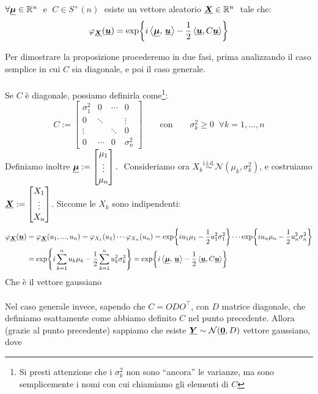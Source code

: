 \begin{proposizione}
    $\forall\underline{{\boldsymbol{\mu}}}\in\mathbb{R}^n\;$ e $\;C\in S^+(n) \;$ esiste un vettore aleatorio $\underline{{\boldsymbol{X}}}\in\mathbb{R}^n\;$ tale che:
    \[\varphi_{\underline{{\boldsymbol{X}}}} (\underline{{\boldsymbol{u}}}) = \exp\!\left\{i\left\langle \underline{{\boldsymbol{\mu}}},\, \underline{{\boldsymbol{u}}} \right\rangle-\frac{1}{2}\left\langle\underline{{\boldsymbol{u}}}, C\underline{{\boldsymbol{u}}}\right\rangle \right\}\]
    \begin{dimostrazione}
        Per dimostrare la proposizione procederemo in due fasi, prima analizzando il caso semplice in cui $C$ sia diagonale, e poi il caso generale.\\
        \\
        Se $C$ è diagonale, possiamo definirla come\footnote{Si presti attenzione che i $\sigma_k^2$ non sono ``ancora'' le varianze, ma sono semplicemente i nomi con cui chiamiamo gli elementi di $C$}:
        \[
        C := 
        \begin{bmatrix}
        \sigma_1^2 & 0 & \cdots & 0\\
        0 & \ddots & & \vdots\\
        \vdots & & \ddots & 0\\
        0 & \cdots & 0 & \sigma_n^2
        \end{bmatrix}\qquad \text{con}\qquad \sigma_k^2\geq0\;\;\forall k = 1, ..., n
        \]
        Definiamo inoltre $\underline{{\boldsymbol{\mu}}} := \begin{bmatrix}\mu_1\\\vdots\\\mu_n\end{bmatrix}.\;$ Consideriamo ora $X_k\overset{\text{i.i.d.}}{\sim}\mathcal{N}(\mu_k, \sigma_k^2)$, e costruiamo $\underline{{\boldsymbol{X}}}:=\begin{bmatrix}X_1\\\vdots\\X_n\end{bmatrix}$. Siccome le $X_k$ sono indipendenti:
        \begin{align*}
            \varphi_{\underline{{\boldsymbol{X}}}}(\underline{{\boldsymbol{u}}}) & = \varphi_{\underline{{\boldsymbol{X}}}}(u_1, ..., u_n) = \varphi_{X_1}(u_1)\cdots \varphi_{X_n}(u_n) = \exp\!\left\{iu_1\mu_1 - \frac{1}{2} u_1^2\sigma_1^2 \right\} \cdots \exp\!\left\{iu_n\mu_n - \frac{1}{2} u_n^2\sigma_n^2 \right\} \\
            & = \exp\!\left\{i \sum_{k=1}^n u_k \mu_k - \frac{1}{2}\sum_{k=1}^n u_k^2 \sigma_k^2 \right\} = \exp\!\left\{i\left\langle \underline{{\boldsymbol{\mu}}},\, \underline{{\boldsymbol{u}}} \right\rangle-\frac{1}{2}\left\langle\underline{{\boldsymbol{u}}}, C\underline{{\boldsymbol{u}}}\right\rangle \right\}
        \end{align*}
        \noindent Che è il vettore gaussiano\\
        \\
        Nel caso generale invece, sapendo che $C=ODO^\top$, con $D$ matrice diagonale, che definiamo esattamente come abbiamo definito $C$ nel punto precedente. Allora (grazie al punto precedente) sappiamo che esiste $\underline{{\boldsymbol{Y}}}\sim\mathcal{N}(\underline{{\boldsymbol{0}}}, D)$ vettore gaussiano, dove

\end{dimostrazione}
\end{proposizione}
